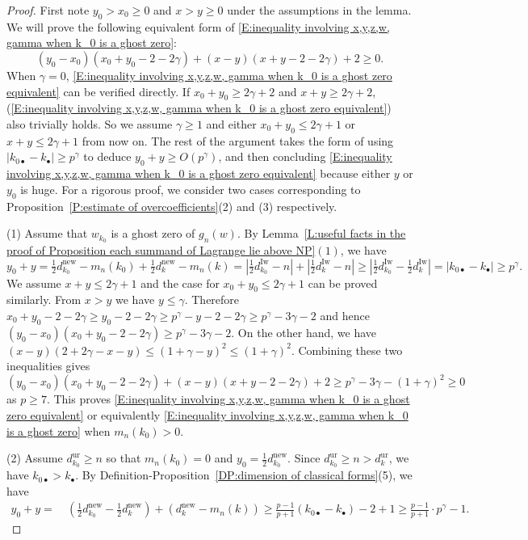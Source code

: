 \documentclass[12pt]{amsart}
\theoremstyle{definition}
\numberwithin{equation}{subsection}
\newcommand{\new}{\mathrm{new}}
\newcommand{\Iw}{\mathrm{Iw}}
\newcommand{\ur}{\mathrm{ur}}
\begin{document}
\begin{proof}
First note $y_0>x_0\geq 0$ and $x>y\geq 0$ under the assumptions in the lemma. We will prove the following equivalent form of \eqref{E:inequality involving x,y,z,w, gamma when k_0 is a ghost zero}:
\begin{equation}
\label{E:inequality involving x,y,z,w, gamma when k_0 is a ghost zero equivalent}
(y_0-x_0)(x_0+y_0-2-2\gamma) + (x-y)(x+y-2-2\gamma) + 2\geq 0.
\end{equation}
When $\gamma=0$, \eqref{E:inequality involving x,y,z,w, gamma when k_0 is a ghost zero equivalent} can be verified directly. If $x_0+y_0\geq 2\gamma+2$ and $x+y\geq 2\gamma+2$, (\ref{E:inequality involving x,y,z,w, gamma when k_0 is a ghost zero equivalent}) also trivially holds. So we assume $\gamma\geq 1$ and either $x_0+y_0\leq 2\gamma+1$ or $x+y\leq 2\gamma+1$ from now on.  
The rest of the argument takes the form of using $|k_{0\bullet}-k_\bullet|\geq p^\gamma$ to deduce $y_0+y \geq O(p^\gamma)$, and then concluding \eqref{E:inequality involving x,y,z,w, gamma when k_0 is a ghost zero equivalent} because either $y$ or $y_0$ is huge.  For a rigorous proof, we consider two cases corresponding to Proposition~\ref{P:estimate of overcoefficients}(2) and (3) respectively.

    (1) Assume that $w_{k_0}$ is a ghost zero of $g_n(w)$. By Lemma~\ref{L:useful facts in the proof of Proposition each summand of Lagrange lie above NP}$(1)$, we have 
		\[
		y_0+y=\tfrac 12 d_{k_0}^\new -m_n(k_0)+\tfrac 12 d_k^\new -m_n(k)=|\tfrac 12 d_{k_0}^\Iw-n|+|\tfrac 12 d_k^\Iw-n|\geq |\tfrac 12 d_{k_0}^\Iw-\tfrac 12 d_k^\Iw|=|k_{0\bullet}-k_\bullet|\geq p^\gamma.
		\]
		We assume $x+y\leq 2\gamma+1$ and the case for $x_0+y_0\leq 2\gamma+1$ can be proved similarly. From $x>y$ we have $y\leq \gamma$. Therefore $x_0+y_0-2-2\gamma\geq y_0-2-2\gamma\geq p^\gamma-y-2-2\gamma\geq p^\gamma-3\gamma-2$ and hence $(y_0-x_0)(x_0+y_0-2-2\gamma)\geq p^\gamma-3\gamma-2$. On the other hand, we have $(x-y)(2+2\gamma-x-y)\leq (1+\gamma-y)^2\leq (1+\gamma)^2$. Combining these two inequalities gives 
		\[
(y_0-x_0)(x_0+y_0-2-2\gamma) + (x-y)(x+y-2-2\gamma) + 2\geq p^\gamma-3\gamma-(1+\gamma)^2\geq 0
		\]
		as $p\geq 7$. This proves \eqref{E:inequality involving x,y,z,w, gamma when k_0 is a ghost zero equivalent} or equivalently \eqref{E:inequality involving x,y,z,w, gamma when k_0 is a ghost zero} when $m_n(k_0)>0$.

        
        (2) Assume $d_{k_0}^\ur\geq n$ so that $m_n(k_0)=0$ and $y_0=\tfrac 12 d_{k_0}^\new$. Since $d_{k_0}^\ur\geq n>d_k^\ur$, we have $k_{0\bullet}>k_\bullet$. By Definition-Proposition~\ref{DP:dimension of classical forms}(5), we have 
\begin{align}
\nonumber
y_0+y=\ & (\tfrac 12 d_{k_0}^\new -\tfrac 12 d_k^\new) +(d_k^\new  -m_n(k))\geq \tfrac{p-1}{p+1}(k_{0\bullet}-k_\bullet)-2 +1\geq \tfrac{p-1}{p+1}\cdot p^\gamma-1.   
\end{align}


\end{proof}
\end{document}
